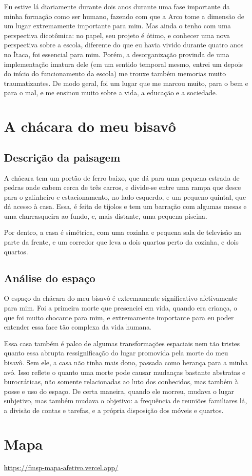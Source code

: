 \documentclass[12pt]{article}
\begin{document}
Eu estive lá diariamente durante dois anos durante uma fase importante da minha formação como ser humano, fazendo com que a Arco tome a dimensão de um lugar extremamente importante para mim. Mas ainda o tenho com uma perspectiva dicotômica: no papel, seu projeto é ótimo, e conhecer uma nova perspectiva sobre a escola, diferente do que eu havia vivido durante quatro anos no Ítaca, foi essencial para mim. Porém, a desorganização provinda de uma implementação imatura dele (em um sentido temporal mesmo, entrei um depois do início do funcionamento da escola) me trouxe também memorias muito traumatizantes. De modo geral, foi um lugar que me marcou muito, para o bem e para o mal, e me ensinou muito sobre a vida, a educação e a sociedade.

\section{A chácara do meu bisavô}
\subsection{Descrição da paisagem}
A chácara tem um portão de ferro baixo, que dá para uma pequena estrada de pedras onde cabem cerca de três carros, e divide-se entre uma rampa que desce para o galinheiro e estacionamento, no lado esquerdo, e um pequeno quintal, que dá acesso à casa. Essa, é feita de tijolos e tem um barração com algumas mesas e uma churrasqueira ao fundo, e, mais distante, uma pequena piscina. 

Por dentro, a casa é simétrica, com uma cozinha e pequena sala de televisão na parte da frente, e um corredor que leva a dois quartos perto da cozinha, e dois quartos.
\subsection{Análise do espaço}
O espaço da chácara do meu bisavô é extremamente significativo afetivamente para mim. Foi a primeira morte que presenciei em vida, quando era criança, o que foi muito chocante para mim, e extremamente importante para eu poder entender essa face tão complexa da vida humana.

Essa casa também é palco de algumas transformações espaciais nem tão tristes quanto essa abrupta ressignificação do lugar promovida pela morte do meu bisavô. Sem ele, a casa não tinha mais dono, passada como herança para a minha avó. Isso reflete o quanto uma morte pode causar mudanças bastante abstratas e burocráticas, não somente relacionadas ao luto dos conhecidos, mas também à posse e uso do espaço. De certa maneira, quando ele morreu, mudava o lugar subjetivo, mas também mudava o objetivo: a frequência de reuniões familiares lá, a divisão de contas e tarefas, e a própria disposição dos móveis e quartos.

\section{Mapa}
\url{https://fmsp-mapa-afetivo.vercel.app/}
\end{document}

